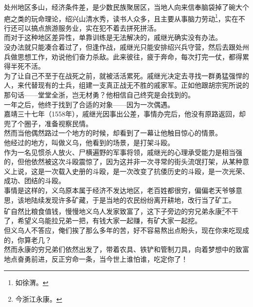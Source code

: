 \begin{multicols}{\theparacolNo}
处州地区多山，经济条件差，是少数民族聚居区，当地人向来信奉脑袋掉了碗大个疤之类的玩命理论，绍兴山清水秀，读书人众多，且主要从事脑力劳动\footnote{如徐渭。}，实在不行还可以搞点旅游服务业，实在犯不着去拼死拼活。\\

而对于这种地区差异性，单靠训练是无法解决的，戚继光确实没有办法。\\

没办法就只能凑合着过了，但逢作战，戚继光只能安排绍兴兵守营，然后去跟处州兵做思想工作，劝说他们奋力杀敌。此来彼往，疲于奔命，每次打完一仗，都得累得半死不活。\\

为了让自己不至于在战死之前，就被活活累死。戚继光决定去寻找一群勇猛强悍的人，来代替现有的士兵，组建一支真正战无不胜的戚家军。正如他跟胡宗宪所说的那句话——堂堂全浙，岂无材勇？他相信自己终究是会找到的。\\

一年之后，他终于找到了合适的对象——因为一次偶遇。\\

嘉靖三十七年（1558年），戚继光因事出公差，事情办完后，他没有原路返回，却兜了个圈子，准备视察民情。\\

然而当他偶然路过一个地方的时候，却看到了一幕让他触目惊心的情景。\\

他经过的地方，叫做义乌，他看到的场景，是打架斗殴。\\

作为一名见惯杀人放火、尸横遍野的军事将领，戚继光的心理承受能力是相当强的，但他依然被这次斗殴震惊了，因为这并非一次寻常的街头流氓打架，从某种意义上说，这是一次载入史册的斗殴，是一次改变了抗倭历史的斗殴，是一次光荣、成功、团结的斗殴。\\

事情是这样的，义乌原本属于经济不发达地区，老百姓都很穷，偏偏老天爷够意思，该地陆续发现许多矿藏，于是当地的农民纷纷离开耕地，改行当了矿工。\\

矿自然比粮食值钱，慢慢地义乌人发家致富了，这下子旁边的穷兄弟永康\footnote{今浙江永康。}不干了，希望义乌能拉兄弟一把，有钱大家一起赚，有矿大家一起挖。\\

但义乌人不答应，俺们挨了那么多年的苦，好不容易熬出点盼头，现在你来吃现成的，你算老几？\\

然而永康的穷兄弟们依然出发了，带着农具、铁铲和管制刀具，向着梦想中的致富地点奋勇前进，反正穷命一条，当今世上谁怕谁，吃定你了！\\


\end{multicols}
